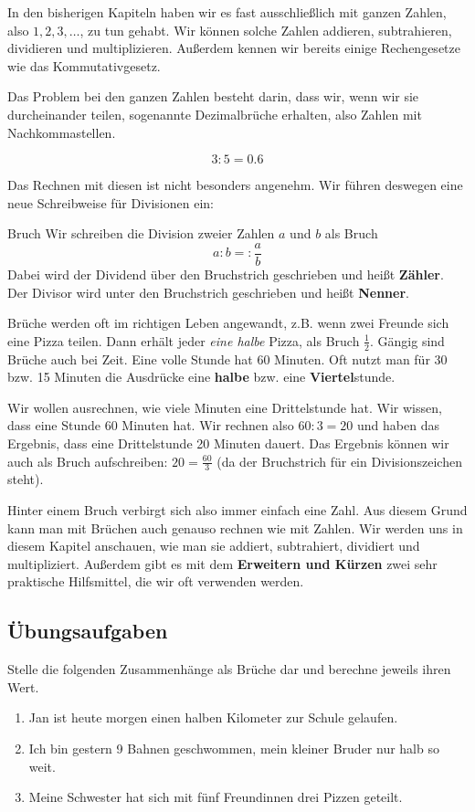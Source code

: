 \documentclass[../../main]{subfiles}
\begin{document}
In den bisherigen Kapiteln haben wir es fast ausschließlich mit ganzen Zahlen, also $1,2,3,\dots$, zu tun gehabt. Wir können solche Zahlen addieren, subtrahieren, dividieren und multiplizieren. Außerdem kennen wir bereits einige Rechengesetze wie das Kommutativgesetz.

Das Problem bei den ganzen Zahlen besteht darin, dass wir, wenn wir sie durcheinander teilen, sogenannte Dezimalbrüche erhalten, also Zahlen mit Nachkommastellen.
\begin{example}{}
\[3:5=0.6\]
\end{example}
Das Rechnen mit diesen ist nicht besonders angenehm. Wir führen deswegen eine neue Schreibweise für Divisionen ein:
\begin{definition}{Bruch}
Wir schreiben die Division zweier Zahlen $a$ und $b$ als Bruch \[a:b=:\frac{a}{b}\]
Dabei wird der Dividend über den Bruchstrich geschrieben und heißt \textbf{Zähler}. Der Divisor wird unter den Bruchstrich geschrieben und heißt \textbf{Nenner}.
\end{definition}
\noindent Brüche werden oft im richtigen Leben angewandt, z.B. wenn zwei Freunde sich eine Pizza teilen. Dann erhält jeder \emph{eine halbe} Pizza, als Bruch $\frac{1}{2}$. Gängig sind Brüche auch bei Zeit. Eine volle Stunde hat 60 Minuten. Oft nutzt man für 30 bzw. 15 Minuten die Ausdrücke eine \textbf{halbe} bzw. eine \textbf{Viertel}stunde.
\begin{example}{}
Wir wollen ausrechnen, wie viele Minuten eine Drittelstunde hat. Wir wissen, dass eine Stunde 60 Minuten hat. Wir rechnen also $60:3=20$ und haben das Ergebnis, dass eine Drittelstunde 20 Minuten dauert. Das Ergebnis können wir auch als Bruch aufschreiben: $20=\frac{60}{3}$ (da der Bruchstrich für ein Divisionszeichen steht).
\end{example}
\noindent Hinter einem Bruch verbirgt sich also immer einfach eine Zahl. Aus diesem Grund kann man mit Brüchen auch genauso rechnen wie mit Zahlen. Wir werden uns in diesem Kapitel anschauen, wie man sie addiert, subtrahiert, dividiert und multipliziert. Außerdem gibt es mit dem \textbf{Erweitern und Kürzen} zwei sehr praktische Hilfsmittel, die wir oft verwenden werden.

\subsection*{Übungsaufgaben}
Stelle die folgenden Zusammenhänge als Brüche dar und berechne jeweils ihren Wert.
\begin{enumerate}
    \item Jan ist heute morgen einen halben Kilometer zur Schule gelaufen.
    \item Ich bin gestern 9 Bahnen geschwommen, mein kleiner Bruder nur halb so weit.
    \item Meine Schwester hat sich mit fünf Freundinnen drei Pizzen geteilt.
\end{enumerate}
\end{document}
